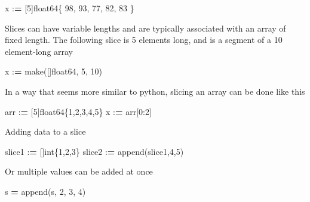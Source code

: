 \documentclass[]{book}
\newenvironment{Shaded}{\begin{snugshade}}{\end{snugshade}}
\newcommand{\BuiltInTok}[1]{#1}
\newcommand{\DecValTok}[1]{\textcolor[rgb]{0.00,0.00,0.81}{#1}}
\newcommand{\NormalTok}[1]{#1}
\newcommand{\OperatorTok}[1]{\textcolor[rgb]{0.81,0.36,0.00}{\textbf{#1}}}
\begin{document}
\begin{Shaded}
\begin{Highlighting}[]
\NormalTok{x :}\OperatorTok{=}\NormalTok{ [}\DecValTok{5}\NormalTok{]float64\{ }\DecValTok{98}\NormalTok{, }\DecValTok{93}\NormalTok{, }\DecValTok{77}\NormalTok{, }\DecValTok{82}\NormalTok{, }\DecValTok{83}\NormalTok{ \}}
\end{Highlighting}
\end{Shaded}

Slices can have variable lengths and are typically associated with an array of fixed length. The following slice is 5 elements long, and is a segment of a 10 element-long array

\begin{Shaded}
\begin{Highlighting}[]
\NormalTok{x :}\OperatorTok{=}\NormalTok{ make([]float64, }\DecValTok{5}\NormalTok{, }\DecValTok{10}\NormalTok{)}
\end{Highlighting}
\end{Shaded}

In a way that seems more similar to python, slicing an array can be done like this

\begin{Shaded}
\begin{Highlighting}[]
\NormalTok{arr :}\OperatorTok{=}\NormalTok{ [}\DecValTok{5}\NormalTok{]float64\{}\DecValTok{1}\NormalTok{,}\DecValTok{2}\NormalTok{,}\DecValTok{3}\NormalTok{,}\DecValTok{4}\NormalTok{,}\DecValTok{5}\NormalTok{\}}
\NormalTok{x :}\OperatorTok{=}\NormalTok{ arr[}\DecValTok{0}\NormalTok{:}\DecValTok{2}\NormalTok{]}
\end{Highlighting}
\end{Shaded}

Adding data to a slice

\begin{Shaded}
\begin{Highlighting}[]
\NormalTok{slice1 :}\OperatorTok{=}\NormalTok{ []}\BuiltInTok{int}\NormalTok{\{}\DecValTok{1}\NormalTok{,}\DecValTok{2}\NormalTok{,}\DecValTok{3}\NormalTok{\}}
\NormalTok{slice2 :}\OperatorTok{=}\NormalTok{ append(slice1,}\DecValTok{4}\NormalTok{,}\DecValTok{5}\NormalTok{)}
\end{Highlighting}
\end{Shaded}

Or multiple values can be added at once

\begin{Shaded}
\begin{Highlighting}[]
\NormalTok{s }\OperatorTok{=}\NormalTok{ append(s, }\DecValTok{2}\NormalTok{, }\DecValTok{3}\NormalTok{, }\DecValTok{4}\NormalTok{)}
\end{Highlighting}
\end{Shaded}
\end{document}
